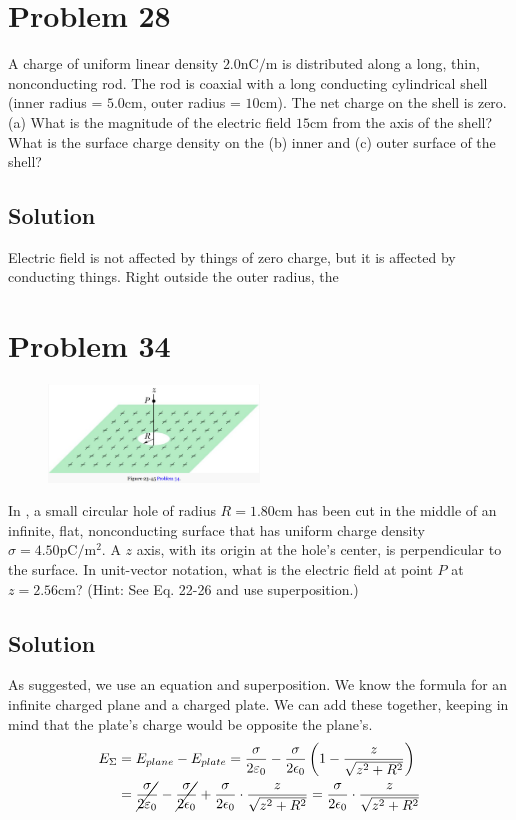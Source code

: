\documentclass[12pt]{article}
\begin{document}
\section{Problem 28}
A charge of uniform linear density $2.0 \unit{\nano\coulomb/\meter}$ is distributed along a long, thin, nonconducting rod. The rod is coaxial with a long conducting cylindrical shell (inner radius = $5.0 \unit{\centi\meter}$, outer radius = $10 \unit{\centi\meter}$). The net charge on the shell is zero. (a) What is the magnitude of the electric field $15 \unit{\centi\meter}$ from the axis of the shell? What is the surface charge density on the (b) inner and (c) outer surface of the shell?

\subsection{Solution}
Electric field is not affected by things of zero charge, but it is affected by conducting things. Right outside the outer radius, the 

\pagebreak
\section{Problem 34}
\begin{figure}
    \vspace{-30pt}
    \includegraphics[width=0.5\textwidth]{picture_10.png} 
\end{figure}
In , a small circular hole of radius $R = 1.80 \unit{\centi\meter}$ has been cut in the middle of an infinite, flat, nonconducting surface that has uniform charge density $\sigma = 4.50 \unit{\pico\coulomb/\meter^2}$. A $z$ axis, with its origin at the hole's center, is perpendicular to the surface. In unit-vector notation, what is the electric field at point $P$ at $z = 2.56 \unit{\centi\meter}$? (Hint: See Eq. 22-26 and use superposition.)

\subsection*{Solution}
As suggested, we use an equation and superposition. We know the formula for an infinite charged plane and a charged plate. We can add these together, keeping in mind that the plate's charge would be opposite the plane's.
\begin{align*}
    E_\Sigma    &=  E_{plane} - E_{plate}
        =   \frac{\sigma}{2\varepsilon_0} - \frac{\sigma}{2\epsilon_0} \left(1 - \frac{z}{\sqrt{z^2 + R^2}}\right)\\
        &=  \cancel{\frac{\sigma}{2\varepsilon_0}} - \cancel{\frac{\sigma}{2\epsilon_0}} + \frac{\sigma}{2\epsilon_0}\cdot\frac{z}{\sqrt{z^2 + R^2}}
        = \frac{\sigma}{2\epsilon_0}\cdot\frac{z}{\sqrt{z^2 + R^2}}
\end{align*}
\end{document}

